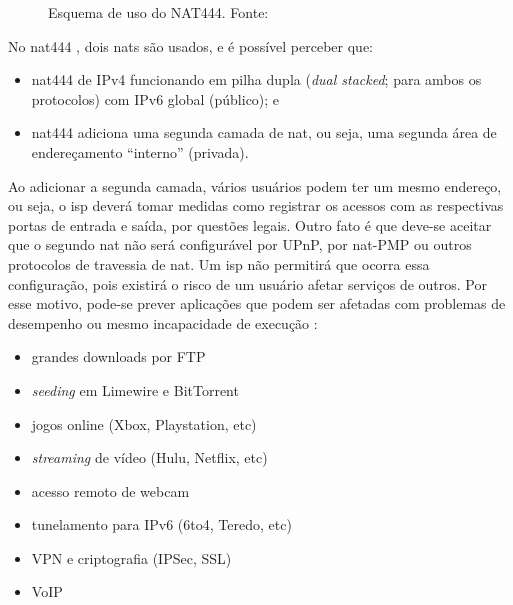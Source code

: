 \begin{figure}[H]
    \centering
    \caption{Esquema de uso do NAT444. Fonte:\cite{site:nat444}}
    \label{fig:nat444}
\end{figure}

No \gls*{nat}444 \cite{site:nat444}, dois \glspl*{nat} são usados, e é possível perceber que:

\begin{itemize}
    \item \gls*{nat}444 de IPv4 funcionando em pilha dupla (\emph{dual stacked}; para
        ambos os protocolos) com IPv6 global (público); e

    \item \gls*{nat}444 adiciona uma segunda camada de \gls*{nat}, ou seja, uma segunda
        área de endereçamento ``interno'' (privada).
\end{itemize}

Ao adicionar a segunda camada, vários usuários podem ter um mesmo endereço, ou seja, o
\gls*{isp} deverá tomar medidas como registrar os acessos com as respectivas portas de
entrada e saída, por questões legais. Outro fato é que deve-se aceitar que o segundo
\gls*{nat} não será configurável por UPnP, por \gls*{nat}-PMP ou outros protocolos de
travessia de \gls*{nat}. Um \gls*{isp} não permitirá que ocorra essa configuração, pois
existirá o risco de um usuário afetar serviços de outros. Por esse motivo, pode-se
prever aplicações que podem ser afetadas com problemas de desempenho ou mesmo
incapacidade de execução \cite{site:rfcnat444}:

\begin{itemize}
    \item grandes downloads por FTP
    \item \emph{seeding} em Limewire e BitTorrent
    \item jogos online (Xbox, Playstation, etc)
    \item \emph{streaming} de vídeo (Hulu, Netflix, etc)
    \item acesso remoto de webcam
    \item tunelamento para IPv6 (6to4, Teredo, etc)
    \item VPN e criptografia (IPSec, SSL)
    \item VoIP
\end{itemize}